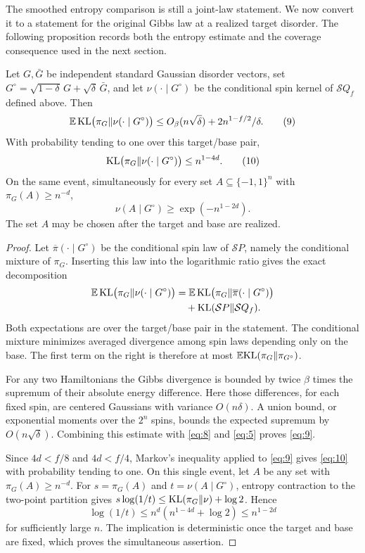 The smoothed entropy comparison is still a joint-law statement. We
now convert it to a statement for the original Gibbs law at a
realized target disorder. The following proposition records both the
entropy estimate and the coverage consequence used in the next section.

\begin{proposition}\label{prop:coverage}
Let $G,\bar G$ be independent standard Gaussian disorder vectors, set
$G^\circ=\sqrt{1-\delta}\,G+\sqrt\delta\,\bar G$, and let
$\nu(\cdot\mid G^\circ)$ be the conditional spin kernel of
$\mathcal SQ_f$ defined above. Then
\[
 \mathbb E\,{\rm KL}\bigl(\pi_G\Vert\nu(\cdot\mid G^\circ)\bigr)
 \le O_\beta(n\sqrt\delta)+2n^{1-f/2}/\delta.
 \tag{9}\label{eq:9}
\]
With probability tending to one over this target/base pair,
\[
 {\rm KL}\bigl(\pi_G\Vert\nu(\cdot\mid G^\circ)\bigr)
 \le n^{1-4d}.
 \tag{10}\label{eq:10}
\]
On the same event, simultaneously for every set
$A\subseteq\{-1,1\}^n$ with $\pi_G(A)\ge n^{-d}$,
\[
 \nu(A\mid G^\circ)\ge\exp(-n^{1-2d}).
\]
The set $A$ may be chosen after the target and base are realized.
\end{proposition}

\begin{proof}
Let $\overline\pi(\cdot\mid G^\circ)$ be the conditional spin
law of $\mathcal SP$, namely the conditional mixture of $\pi_G$.
Inserting this law into the logarithmic ratio gives the exact
decomposition
\[
 \begin{aligned}
 \mathbb E\,{\rm KL}\bigl(\pi_G\Vert\nu(\cdot\mid G^\circ)\bigr)
 &=\mathbb E\,{\rm KL}\bigl(\pi_G\Vert
                 \overline\pi(\cdot\mid G^\circ)\bigr)\\
 &\quad+{\rm KL}(\mathcal SP\Vert\mathcal SQ_f).
 \end{aligned}
\]
Both expectations are over the target/base pair in the statement.
The conditional mixture minimizes averaged divergence among spin laws
depending only on the base. The first term on the right is therefore
at most $\mathbb E{\rm KL}(\pi_G\Vert\pi_{G^\circ})$.

For any two Hamiltonians the Gibbs divergence is bounded by twice
$\beta$ times the supremum of their absolute energy difference.
Here those differences, for each fixed spin, are centered Gaussians
with variance $O(n\delta)$. A union bound, or exponential moments
over the $2^n$ spins, bounds the expected supremum by
$O(n\sqrt\delta)$. Combining this estimate with \eqref{eq:8}
and \eqref{eq:5} proves \eqref{eq:9}.

Since $4d<f/8$ and $4d<f/4$, Markov's inequality applied to
\eqref{eq:9} gives \eqref{eq:10} with probability tending to one.
On this single event, let $A$ be any set with $\pi_G(A)\ge n^{-d}$.
For $s=\pi_G(A)$ and $t=\nu(A\mid G^\circ)$, entropy
contraction to the two-point partition gives
$s\log(1/t)\le {\rm KL}(\pi_G\Vert\nu)+\log2$.
Hence
\[
 \log(1/t)\le n^d(n^{1-4d}+\log2)\le n^{1-2d}
\]
for sufficiently large $n$. The implication is deterministic once
the target and base are fixed, which proves the simultaneous assertion.
\end{proof}
